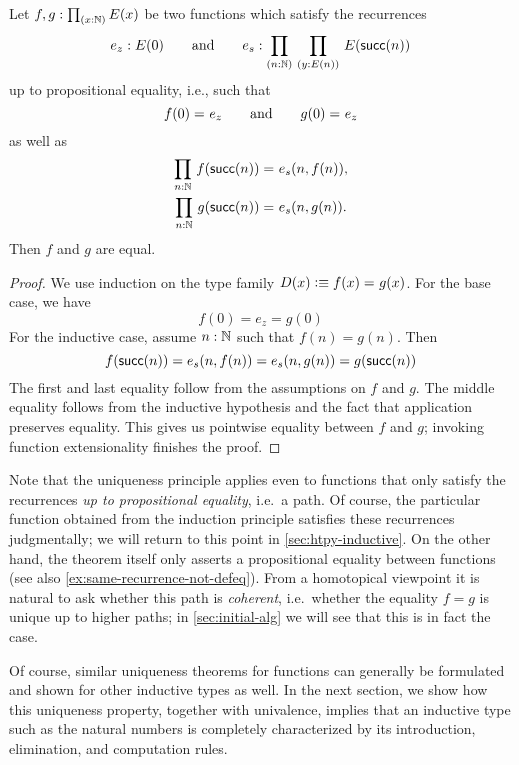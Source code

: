 \begin{thm}\label{thm:nat-uniq}
Let $f,g : \prd{x:\nat} E(x)$ be two functions which satisfy the recurrences 
%
\begin{equation*}
  e_z : E(0)
  \qquad\text{and}\qquad
  e_s : \prd{n : \nat}{y : E(n)} E(\suc(n))
\end{equation*}
%
up to propositional equality, i.e., such that
\begin{equation*}
  f(0) =_{} e_z
  \qquad\text{and}\qquad
  g(0) =_{} e_z
\end{equation*}
as well as
\begin{gather*}
  \prd{n : \nat} \id{f(\suc(n))}{e_s(n, f(n))},\\
  \prd{n : \nat} \id{g(\suc(n))}{e_s(n, g(n))}.
\end{gather*}
Then $f$ and $g$ are equal.
\end{thm}

\begin{proof}
We use induction on the type family $D(x) \vcentcolon\equiv f(x) =_{} g(x)$. For the base case, we have \[f(0) = e_z = g(0)\]
For the inductive case, assume $n : \mathbb{N}$ such that $f(n) = g(n)$. Then
\[ f(\mathsf{succ}(n)) = e_s(n, f(n)) = e_s(n, g(n)) = g(\mathsf{succ}(n)) \]
The first and last equality follow from the assumptions on $f$ and $g$. The middle equality follows from the inductive hypothesis and the fact that application preserves equality. This gives us pointwise equality between $f$ and $g$; invoking function extensionality finishes the proof.
\end{proof}

Note that the uniqueness principle applies even to functions that only satisfy the recurrences \emph{up to propositional equality}, i.e.\ a path.
Of course, the particular function obtained from the induction principle satisfies these recurrences judgmentally; we will return to this point in \autoref{sec:htpy-inductive}.
On the other hand, the theorem itself only asserts a propositional equality between functions (see also \autoref{ex:same-recurrence-not-defeq}).
From a homotopical viewpoint it is natural to ask whether this path is \emph{coherent}, i.e.\ whether the equality $f=g$ is unique up to higher paths; in \autoref{sec:initial-alg} we will see that this is in fact the case.

Of course, similar uniqueness theorems for functions can generally be formulated and shown for other inductive types as well.
In the next section, we show how this uniqueness property, together with univalence, implies that an inductive type such as the natural numbers is completely characterized by its introduction, elimination, and computation rules.

